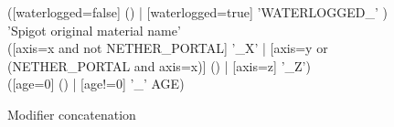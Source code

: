 \documentclass[11pt]{article}
\begin{document}
\begin{figure}
	\begin{rail}
		([waterlogged=false] () | [waterlogged=true] 'WATERLOGGED\_' ) \\
		'Spigot original material name' \\
		([axis=x and not NETHER\_PORTAL] '\_X' | [axis=y or (NETHER\_PORTAL and axis=x)] () | [axis=z] '\_Z') \\
		([age=0] () | [age!=0] '\_' AGE)
	\end{rail}
	\caption{Modifier concatenation}
\end{figure}



	
\end{document}
